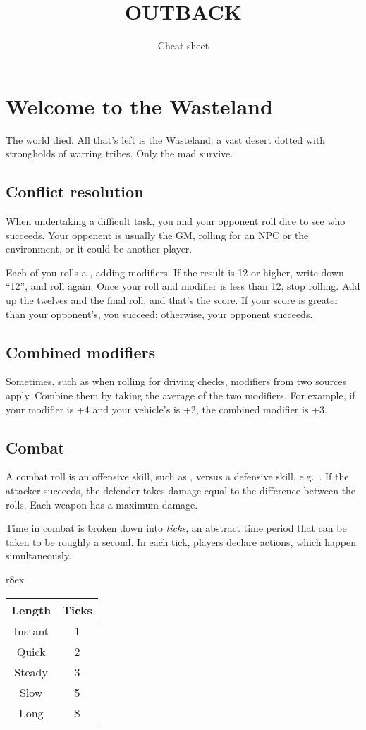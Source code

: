 \documentclass[10pt, a4paper, twocolumn]{article}
\title{\uppercase{Outback}}
\date{}
\begin{document}
\subtitle{Cheat sheet}
\compacttitle

\section{Welcome to the Wasteland}
The world died. All that's left is the Wasteland: a vast desert dotted with strongholds of warring tribes. Only the mad survive.

\subsection{Conflict resolution}
When undertaking a difficult task, you and your opponent roll dice to see who succeeds. Your oppenent is usually the GM, rolling for an NPC or the environment, or it could be another player.

Each of you rolls a , adding modifiers. If the result is 12 or higher, write down ``12'', and roll again. Once your roll and modifier is less than 12, stop rolling. Add up the twelves and the final roll, and that's the score. If your score is greater than your opponent's, you succeed; otherwise, your opponent succeeds.

\subsection{Combined modifiers}
Sometimes, such as when rolling for driving checks, modifiers from two sources apply. Combine them by taking the average of the two modifiers. For example, if your  modifier is +4 and your vehicle's  is +2, the combined modifier is +3.

\subsection{Combat}
A combat roll is an offensive skill, such as , versus a defensive skill, e.g.\ . If the attacker succeeds, the defender takes damage equal to the difference between the rolls. Each weapon has a maximum damage.

Time in combat is broken down into \emph{ticks}, an abstract time period that can be taken to be roughly a second. In each tick, players declare actions, which happen simultaneously.

\begin{wraptable}[5]{r}{8ex}
  \small
\vspace*{-4ex}
\hspace*{-4.5ex}
\begin{tabular}{cc}
  Length   & Ticks \\
  \hline
  Instant  & 1     \\
  Quick    & 2     \\
  Steady   & 3     \\
  Slow     & 5     \\
  Long     & 8
\end{tabular}
\end{wraptable}
\end{document}
